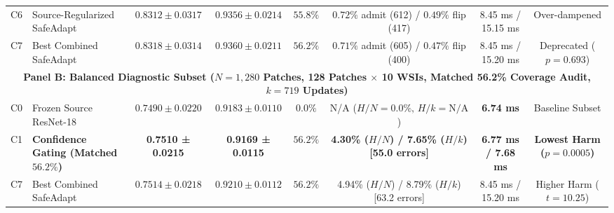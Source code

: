 \documentclass[conference]{IEEEtran}
\begin{document}
\begin{table}[t]
{\begin{tabular}{llcccccc}
C6 & Source-Regularized SafeAdapt & $0.8312 \pm 0.0317$ & $0.9356 \pm 0.0214$ & $55.8\%$ & $0.72\%$ admit (612) / $0.49\%$ flip (417) & 8.45 ms / 15.15 ms & Over-dampened \\
C7 & Best Combined SafeAdapt & $0.8318 \pm 0.0314$ & $0.9360 \pm 0.0211$ & $56.2\%$ & $0.71\%$ admit (605) / $0.47\%$ flip (400) & 8.45 ms / 15.20 ms & Deprecated ($p=0.693$) \\
\midrule
\multicolumn{8}{c}{\textbf{Panel B: Balanced Diagnostic Subset ($N=1{,}280$ Patches, 128 Patches $\times$ 10 WSIs, Matched 56.2\% Coverage Audit, $k=719$ Updates)}} \\
\midrule
C0 & Frozen Source ResNet-18 & $0.7490 \pm 0.0220$ & $0.9183 \pm 0.0110$ & $0.0\%$ & N/A ($H/N=0.0\%,\, H/k=\text{N/A}$) & \textbf{6.74 ms} & Baseline Subset \\
C1 & \textbf{Confidence Gating (Matched $56.2\%$)} & \textbf{0.7510 ± 0.0215} & \textbf{0.9169 ± 0.0115} & $56.2\%$ & \textbf{4.30\% ($H/N$) / 7.65\% ($H/k$) [55.0 errors]} & \textbf{6.77 ms / 7.68 ms} & \textbf{Lowest Harm ($p=0.0005$)} \\
C7 & Best Combined SafeAdapt & $0.7514 \pm 0.0218$ & $0.9210 \pm 0.0112$ & $56.2\%$ & 4.94\% ($H/N$) / 8.79\% ($H/k$) [63.2 errors] & 8.45 ms / 15.20 ms & Higher Harm ($t=10.25$) \\
\bottomrule
\end{tabular}%
}
\end{table}
\end{document}
